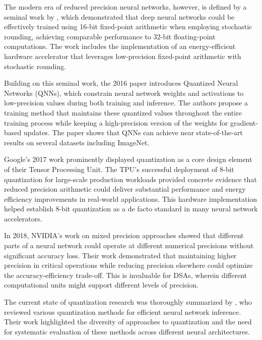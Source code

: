\documentclass[twocolumn]{article}
\begin{document}
The modern era of reduced precision neural networks, however, is defined by a
seminal work by \citeauthor{gupta2015deep} \cite{gupta2015deep}, which
demonstrated that deep neural networks could be effectively trained using 16-bit
fixed-point arithmetic when employing stochastic rounding, achieving comparable
performance to 32-bit floating-point computations. The work includes the
implementation of an energy-efficient hardware accelerator that leverages
low-precision fixed-point arithmetic with stochastic rounding.

Building on this seminal work, the 2016 \citeauthor{hubara2016quantized} paper
\cite{hubara2016quantized} introduces Quantized Neural Networks (QNNs), which
constrain neural network weights and activations to low-precision values during
both training and inference. The authors propose a training method that
maintains these quantized values throughout the entire training process while
keeping a high-precision version of the weights for gradient-based updates. The
paper shows that QNNs can achieve near state-of-the-art results on several
datasets including ImageNet.

Google's 2017 work \cite{jouppi2017datacenter} prominently displayed
quantization as a core design element of their Tensor Processing Unit.  The
TPU's successful deployment of 8-bit quantization for large-scale production
workloads provided concrete evidence that reduced precision arithmetic could
deliver substantial performance and energy efficiency improvements in real-world
applications. This hardware implementation helped establish 8-bit quantization
as a de facto standard in many neural network accelerators.

In 2018, NVIDIA's work on mixed precision approaches
\cite{micikevicius2018mixed} showed that different parts of a neural network
could operate at different numerical precisions without significant accuracy
loss. Their work demonstrated that maintaining higher precision in critical
operations while reducing precision elsewhere could optimize the
accuracy-efficiency trade-off. This is invaluable for DSAs, wherein different
computational units might support different levels of precision.

The current state of quantization research was thoroughly summarized by
\cite{gholami2021survey}, who reviewed various quantization methods for
efficient neural network inference. Their work highlighted the diversity of
approaches to quantization and the need for systematic evaluation of these
methods across different neural architectures. 
\end{document}
